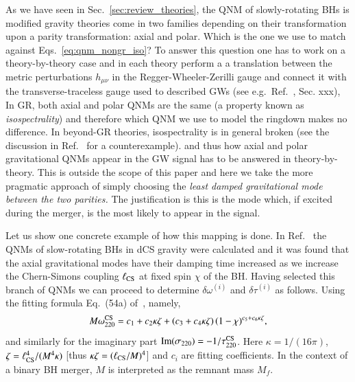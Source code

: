 \documentclass[twocolumn,
               prd,
               aps,
               superscriptaddress,
               tightenlines,
               nofootinbib,
               eqsecnum,
               amsfonts,
               amsmath,
               longbibliography]{revtex4-1}
\newcommand{\Mf}{M_f}
\begin{document}
As we have seen in Sec.~\ref{sec:review_theories}, the QNM of slowly-rotating BHs
is modified gravity theories come in two families depending on their transformation upon a parity
transformation: axial and polar. Which is the one we use to match against Eqs.~\eqref{eq:qnm_nongr_iso}?
%
To answer this question one has to work on a theory-by-theory case and in each theory perform a
a translation between the metric perturbations $h_{\mu\nu}$ in the Regger-Wheeler-Zerilli gauge and
connect it with the transverse-traceless gauge used to described GWs (see e.g.~Ref.~\cite{Maggiore:2018sht}, Sec. xxx),
%
In GR, both axial and polar QNMs are the same (a property known as \emph{isospectrality}) and therefore which
QNM we use to model the ringdown makes no difference.
%
In beyond-GR theories, isospectrality is in general broken (see the discussion
in Ref.~\cite{Hui:2021cpm} for a counterexample). and thus how axial and polar
gravitational QNMs appear in the GW signal has to be answered in
theory-by-theory.
%
This is outside the scope of this paper and here we take the more pragmatic
approach of simply choosing the \emph{least damped gravitational mode between
the two parities.}
%
The justification is this is the mode which, if excited during the merger, is
the most likely to appear in the signal.

Let us show one concrete example of how this mapping is done.
%
In Ref.~\cite{Wagle:2021tam} the QNMs of slow-rotating BHs in dCS gravity were calculated
and it was found that the axial gravitational modes have their damping time increased as we
increase the Chern-Simons coupling $\ell_{\rm CS}$ at fixed spin $\chi$ of the BH.
%
Having selected this branch of QNMs we can proceed to determine $\delta\omega^{(i)}$ and $\delta\tau^{(i)}$ as follows.
%
Using the fitting formula Eq.~(54a) of~\cite{Wagle:2021tam}, namely,
%
\begin{equation}
    M \omega^{\rm CS}_{220} = c_{1} + c_{2} \kappa \zeta + (c_{3} + c_{4} \kappa \zeta) \, (1 - \chi)^{c_{5} + c_{6} \kappa \zeta},
    \label{eq:omega_dsc_eg}
\end{equation}
%
and similarly for the imaginary part ${\rm Im}(\sigma_{220}) =  - 1 / \tau^{\rm CS}_{220}$.
%
Here $\kappa = 1/(16 \pi)$, $\zeta = \ell_{\rm CS}^{4} / (M^4 \kappa)$ [thus $\kappa \zeta = (\ell_{\rm CS} / M)^4$]
and $c_{i}$ are fitting coefficients.
%
In the context of a binary BH merger, $M$ is interpreted as the remnant mass $\Mf$.
\end{document}
